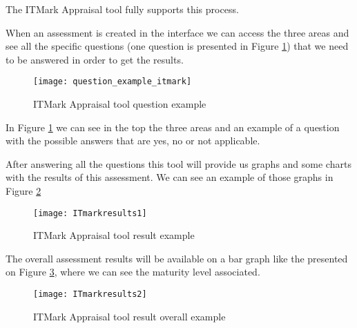 The ITMark Appraisal tool fully supports this process.


When an assessment is created in the interface we can access the three areas and see all the specific questions (one question is presented in Figure \ref{fig:itmark_question}) that we need to be answered in order to get the results.

\begin{figure}[h]
	\begin{center}
		\leavevmode
		\texttt{[image: question\_example\_itmark]}
		\caption{ITMark Appraisal tool question example}
		\label{fig:itmark_question}
	\end{center}
\end{figure}

In Figure \ref{fig:itmark_question} we can see in the top the three areas and an example of a question with the possible answers that are yes, no or not applicable.

After answering all the questions this tool will provide us graphs and some charts with the results of this assessment. We can see an example of those graphs in Figure \ref{fig:itmark_result1}

\begin{figure}[h]
	\begin{center}
		\leavevmode
		\texttt{[image: ITmarkresults1]}
		\caption{ITMark Appraisal tool result example}
		\label{fig:itmark_result1}
	\end{center}
\end{figure}

The overall assessment results will be available on a bar graph like the presented on Figure \ref{fig:itmark_result2}, where we can see the maturity level associated.

\begin{figure}[h]
	\begin{center}
		\leavevmode
		\texttt{[image: ITmarkresults2]}
		\caption{ITMark Appraisal tool result overall example}
		\label{fig:itmark_result2}
	\end{center}
\end{figure}